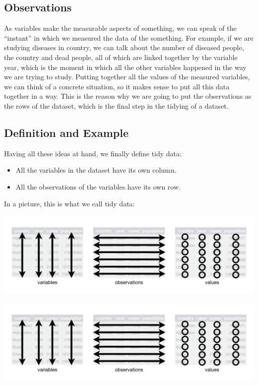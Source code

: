 \documentclass[]{book}
\begin{document}
\subsection{Observations}\label{observations}

As variables make the measurable aspects of something, we can speak of
the ``instant'' in which we measured the data of the something. For
example, if we are studying diseases in country, we can talk about the
number of diseased people, the country and dead people, all of which are
linked together by the variable year, which is the moment in which all
the other variables happened in the way we are trying to study. Putting
together all the values of the measured variables, we can think of a
concrete situation, so it makes sense to put all this data together in a
way. This is the reason why we are going to put the observations as the
rows of the dataset, which is the final step in the tidying of a
dataset.

\subsection{Definition and Example}\label{definition-and-example}

Having all these ideas at hand, we finally define tidy data:

\begin{itemize}
\item
  All the variables in the dataset have its own column.
\item
  All the observations of the variables have its own row.
\end{itemize}

In a picture, this is what we call tidy data:

\includegraphics{images/tidy-1.png}

\includegraphics[width=26.67in]{images/tidy-1}
\end{document}
